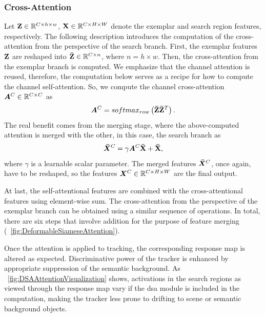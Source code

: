 \subsubsection{Cross-Attention}

Let $\mathbf{Z} \in \mathbb{R}^{{C} \times {h} \times {w}}$, $\mathbf{X} \in \mathbb{R}^{{C} \times {H} \times {W}}$ denote the exemplar and search region features, respectively. The following description introduces the computation of the cross-attention from the perspective of the search branch. First, the exemplar features $\mathbf{Z}$ are reshaped into $\mathbf{\bar{Z}} \in \mathbb{R}^{{C} \times {n}}$, where $n = h \times w$. Then, the cross-attention from the exemplar branch is computed. We emphasize that the channel attention is reused, therefore, the computation below serves as a recipe for how to compute the channel self-attention. So, we compute the channel cross-attention $\bm{A}^{C} \in \mathbb{R}^{{C} \times {C}}$ as
\begin{equation}
    \label{eq:CrossAttentionCalc}
    \bm{A}^{C} =
    {softmax_{row}} \left( \mathbf{\bar{Z}} \mathbf{\bar{Z}}^T \right).
\end{equation}
The real benefit comes from the merging stage, where the above-computed attention is merged with the other, in this case, the search branch as
\begin{equation}
    \label{eq:CrossAttentionMerge}
    \bm{\bar{X}}^{C} =
    \gamma \bm{A}^{C} \mathbf{\bar{X}} + \mathbf{\bar{X}},
\end{equation}
where $\gamma$ is a learnable scalar parameter. The merged features $\bm{\bar{X}}^{C}$, once again, have to be reshaped, so the features $\bm{X}^{C} \in \mathbb{R}^{{C} \times {H} \times {W}}$ are the final output.

At last, the self-attentional features are combined with the cross-attentional features using element-wise sum. The cross-attention from the perspective of the exemplar branch can be obtained using a similar sequence of operations. In total, there are six steps that involve addition for the purpose of feature merging (\figtext{}~\ref{fig:DeformableSiameseAttention}).

Once the attention is applied to tracking, the corresponding response map is altered as expected. Discriminative power of the tracker is enhanced by appropriate suppression of the semantic background. As \figtext{}~\ref{fig:DSAAttentionVisualization} shows, activations in the search regions as viewed through the response map vary if the \gls{dsa} module is included in the computation, making the tracker less prone to drifting to scene or semantic background objects.

